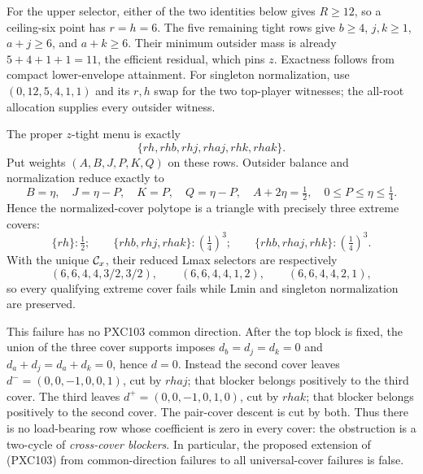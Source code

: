 \documentclass[11pt]{article}
\begin{document}
For the upper selector, either of the two identities below gives \(R\ge12\),
so a ceiling-six point has \(r=h=6\).  The five remaining tight rows give
\(b\ge4\), \(j,k\ge1\), \(a+j\ge6\), and \(a+k\ge6\).  Their
minimum outsider mass is already \(5+4+1+1=11\), the efficient residual,
which pins \(z\).  Exactness follows from compact lower-envelope attainment.
For singleton normalization, use
\((0,12,5,4,1,1)\) and its \(r,h\) swap for the two top-player
witnesses; the all-root allocation supplies every outsider witness.

The proper \(z\)-tight menu is exactly
\[
 \{rh,rhb,rhj,rhaj,rhk,rhak\}.
\]
Put weights \((A,B,J,P,K,Q)\) on these rows.  Outsider balance and
normalization reduce exactly to
\begin{equation}
 B=\eta,\quad J=\eta-P,\quad K=P,\quad Q=\eta-P,
 \quad A+2\eta=\tfrac12,
 \quad 0\le P\le\eta\le\tfrac14.                              \tag{PXC104d}
\end{equation}
Hence the normalized-cover polytope is a triangle with precisely three
extreme covers:
\begin{equation}
 \{rh\}:\tfrac12;\qquad
 \{rhb,rhj,rhak\}:\left(\tfrac14\right)^3;\qquad
 \{rhb,rhaj,rhk\}:\left(\tfrac14\right)^3.                    \tag{PXC104e}
\end{equation}
With the unique \({\cal C}_x\), their reduced Lmax selectors are respectively
\begin{equation}
 (6,6,4,4,3/2,3/2),\qquad
 (6,6,4,4,1,2),\qquad
 (6,6,4,4,2,1),                                                \tag{PXC104f}
\end{equation}
so every qualifying extreme cover fails while Lmin and singleton
normalization are preserved.

This failure has no PXC103 common direction.  After the top block is fixed,
the union of the three cover supports imposes
\(d_b=d_j=d_k=0\) and \(d_a+d_j=d_a+d_k=0\), hence \(d=0\).
Instead the second cover leaves
\(d^-=(0,0,-1,0,0,1)\), cut by \(rhaj\); that blocker belongs
positively to the third cover.  The third leaves
\(d^+=(0,0,-1,0,1,0)\), cut by \(rhak\); that blocker belongs
positively to the second cover.  The pair-cover descent is cut by both.
Thus there is no load-bearing row whose coefficient is zero in every cover:
the obstruction is a two-cycle of \emph{cross-cover blockers}.  In
particular, the proposed extension of (PXC103) from common-direction failures
to all universal-cover failures is false.
\end{document}
